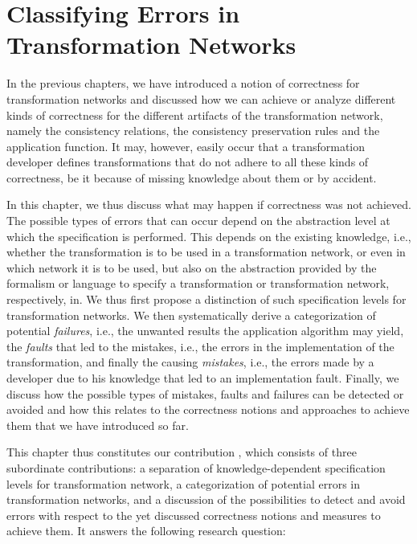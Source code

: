 \chapter{Classifying Errors in Transformation Networks 
}
\label{chap:errors}

In the previous chapters, we have introduced a notion of correctness for transformation networks and discussed how we can achieve or analyze different kinds of correctness for the different artifacts of the transformation network, namely the consistency relations, the consistency preservation rules and the application function.
It may, however, easily occur that a transformation developer defines transformations that do not adhere to all these kinds of correctness, be it because of missing knowledge about them or by accident.

In this chapter, we thus discuss what may happen if correctness was not achieved.
The possible types of errors that can occur depend on the abstraction level at which the specification is performed. 
This depends on the existing knowledge, i.e., whether the transformation is to be used in a transformation network, or even in which network it is to be used, but also on the abstraction provided by the formalism or language to specify a transformation or transformation network, respectively, in.
We thus first propose a distinction of such specification levels for transformation networks.
We then systematically derive a categorization of potential \emph{failures}, i.e., the unwanted results the application algorithm may yield, the \emph{faults} that led to the mistakes, i.e., the errors in the implementation of the transformation, and finally the causing \emph{mistakes}, i.e., the errors made by a developer due to his knowledge that led to an implementation fault.
Finally, we discuss how the possible types of mistakes, faults and failures can be detected or avoided and how this relates to the correctness notions and approaches to achieve them that we have introduced so far.

This chapter thus constitutes our contribution , which consists of three subordinate contributions: a separation of knowledge-dependent specification levels for transformation network, a categorization of potential errors in transformation networks, and a discussion of the possibilities to detect and avoid errors with respect to the yet discussed correctness notions and measures to achieve them.
It answers the following research question:

